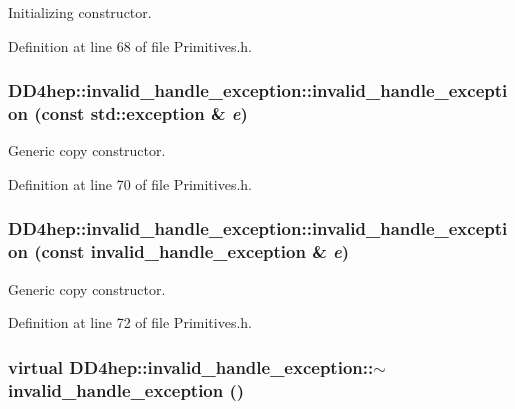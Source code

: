 Initializing constructor. 

Definition at line 68 of file Primitives.h.\hypertarget{class_d_d4hep_1_1invalid__handle__exception_a9f983790d122d9b8b81c1147a99a3e01}{
\subsubsection[{invalid\_\-handle\_\-exception}]{\setlength{\rightskip}{0pt plus 5cm}DD4hep::invalid\_\-handle\_\-exception::invalid\_\-handle\_\-exception (const std::exception \& {\em e})}}
\label{class_d_d4hep_1_1invalid__handle__exception_a9f983790d122d9b8b81c1147a99a3e01}


Generic copy constructor. 

Definition at line 70 of file Primitives.h.\hypertarget{class_d_d4hep_1_1invalid__handle__exception_a4216bbb641a3d4bb30d71f24a835da51}{
\subsubsection[{invalid\_\-handle\_\-exception}]{\setlength{\rightskip}{0pt plus 5cm}DD4hep::invalid\_\-handle\_\-exception::invalid\_\-handle\_\-exception (const {\bf invalid\_\-handle\_\-exception} \& {\em e})}}
\label{class_d_d4hep_1_1invalid__handle__exception_a4216bbb641a3d4bb30d71f24a835da51}


Generic copy constructor. 

Definition at line 72 of file Primitives.h.\hypertarget{class_d_d4hep_1_1invalid__handle__exception_aaf1f7c315a89fbbe7c545eca6a27b9d8}{
\subsubsection[{$\sim$invalid\_\-handle\_\-exception}]{\setlength{\rightskip}{0pt plus 5cm}virtual DD4hep::invalid\_\-handle\_\-exception::$\sim$invalid\_\-handle\_\-exception ()}}
\label{class_d_d4hep_1_1invalid__handle__exception_aaf1f7c315a89fbbe7c545eca6a27b9d8}


